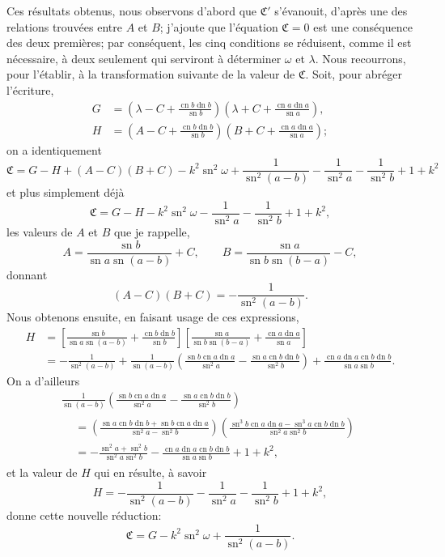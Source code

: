 \documentclass[11pt,leqno,oneside,letterpaper]{book}[2005/09/16]
\DeclareMathOperator{\sn}{sn}
\DeclareMathOperator{\cn}{cn}
\DeclareMathOperator{\dn}{dn}
\begin{document}
Ces r\'esultats obtenus, nous observons d'abord que $\mathfrak{C}'$ s'\'evanouit, d'apr\`es
une des relations trouv\'ees entre $A$ et $B$; j'ajoute que l'\'equation $\mathfrak{C} = 0$
est une cons\'equence des deux premi\`eres; par cons\'equent, les cinq conditions
se r\'eduisent, comme il est n\'ecessaire, \`a deux seulement qui serviront
\`a d\'eterminer $\omega$ et $\lambda$. Nous recourrons, pour l'\'etablir, \`a la transformation
suivante de la valeur de $\mathfrak{C}$. Soit, pour abr\'eger l'\'ecriture,
\begin{align*}
G &= \left( \lambda - C + \frac{\cn b \dn b}{\sn b} \right)
     \left( \lambda + C + \frac{\cn a \dn a}{\sn a} \right), \\
H &= \left(       A - C + \frac{\cn b \dn b}{\sn b} \right)
     \left(       B + C + \frac{\cn a \dn a}{\sn a} \right);
\end{align*}
on a identiquement
\[
\mathfrak{C} = G - H + (A-C)(B+C)
             - k^2\sn^2 \omega + \frac{1}{\sn^2 (a-b)}
             - \frac{1}{\sn^2 a} - \frac{1}{\sn^2 b} + 1 + k^2
\]
et plus simplement d\'ej\`a
\[
\mathfrak{C} = G - H - k^2 \sn^2 \omega - \frac{1}{\sn^2 a} - \frac{1}{\sn^2 b} + 1 + k^2,
\]
les valeurs de $A$ et $B$ que je rappelle,
\[
A = \frac{ \sn b }{ \sn a \sn (a-b) } + C, \qquad
B = \frac{ \sn a }{ \sn b \sn (b-a) } - C,
\]
donnant
\[
(A-C)(B+C) = - \frac{1}{\sn^2 (a-b)}.
\]
Nous obtenons ensuite, en faisant usage de ces expressions,
\begin{align*}
H &= \left[ \tfrac{ \sn b }{ \sn a \sn (a-b) } + \tfrac{ \cn b \dn b }{ \sn b } \right]
     \left[ \tfrac{ \sn a }{ \sn b \sn (b-a) } + \tfrac{ \cn a \dn a }{ \sn a } \right] \\
  &= -\tfrac{1}{\sn^2(a-b)} + \tfrac{1}{\sn (a-b)}
     \left( \tfrac{ \sn b \cn a \dn a }{ \sn^2 a }
           - \tfrac{ \sn a \cn b \dn b }{ \sn^2 b } \right)
     + \tfrac{ \cn a \dn a \cn b \dn b }{ \sn a \sn b }.
\end{align*}
On a d'ailleurs
\begin{multline*}
\frac{1}{\sn(a-b)} \left( \frac{\sn b \cn a \dn a}{\sn^2 a}
                         - \frac{\sn a \cn b \dn b}{\sn^2 b} \right) \\
\begin{aligned}
&= \left( \frac{ \sn a \cn b \dn b + \sn b \cn a \dn a }{
                  \sn^2 a - \sn^2 b } \right)
   \left( \frac{ \sn^3 b \cn a \dn a - \sn^3 a \cn b \dn b }{
                  \sn^2 a \sn^2 b } \right) \\
&= -\frac{ \sn^2 a + \sn^2 b }{ \sn^2 a \sn^2 b }
   -\frac{ \cn a \dn a \cn b \dn b }{ \sn a \sn b } + 1 + k^2,
\end{aligned}
\end{multline*}
et la valeur de $H$ qui en r\'esulte, \`a savoir
\[
H = -\frac{1}{\sn^2 (a-b)} - \frac{1}{\sn^2 a} - \frac{1}{\sn^2 b} + 1 + k^2,
\]
donne cette nouvelle r\'eduction:
\[
\mathfrak{C} = G - k^2 \sn^2 \omega + \frac{1}{\sn^2 (a-b) }.
\]
\end{document}
